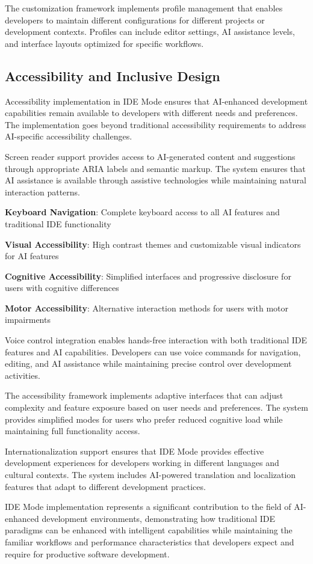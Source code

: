 The customization framework implements profile management that enables developers to maintain different configurations for different projects or development contexts. Profiles can include editor settings, AI assistance levels, and interface layouts optimized for specific workflows.

\subsection*{Accessibility and Inclusive Design}

Accessibility implementation in IDE Mode ensures that AI-enhanced development capabilities remain available to developers with different needs and preferences. The implementation goes beyond traditional accessibility requirements to address AI-specific accessibility challenges.

Screen reader support provides access to AI-generated content and suggestions through appropriate ARIA labels and semantic markup. The system ensures that AI assistance is available through assistive technologies while maintaining natural interaction patterns.

\begin{expandedlist}
    \item \textbf{Keyboard Navigation}: Complete keyboard access to all AI features and traditional IDE functionality
    \item \textbf{Visual Accessibility}: High contrast themes and customizable visual indicators for AI features
    \item \textbf{Cognitive Accessibility}: Simplified interfaces and progressive disclosure for users with cognitive differences
    \item \textbf{Motor Accessibility}: Alternative interaction methods for users with motor impairments
\end{expandedlist}

Voice control integration enables hands-free interaction with both traditional IDE features and AI capabilities. Developers can use voice commands for navigation, editing, and AI assistance while maintaining precise control over development activities.

The accessibility framework implements adaptive interfaces that can adjust complexity and feature exposure based on user needs and preferences. The system provides simplified modes for users who prefer reduced cognitive load while maintaining full functionality access.

Internationalization support ensures that IDE Mode provides effective development experiences for developers working in different languages and cultural contexts. The system includes AI-powered translation and localization features that adapt to different development practices.

IDE Mode implementation represents a significant contribution to the field of AI-enhanced development environments, demonstrating how traditional IDE paradigms can be enhanced with intelligent capabilities while maintaining the familiar workflows and performance characteristics that developers expect and require for productive software development.

